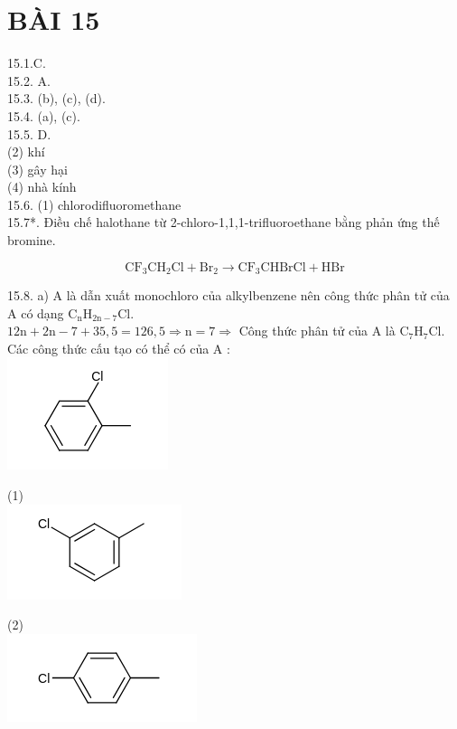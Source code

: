 \documentclass[10pt]{article}
\begin{document}
\section*{BÀI 15}
15.1.C.\\
15.2. A.\\
15.3. (b), (c), (d).\\
15.4. (a), (c).\\
15.5. D.\\
(2) khí\\
(3) gây hại\\
(4) nhà kính\\
15.6. (1) chlorodifluoromethane\\
15.7*. Điều chế halothane từ 2-chloro-1,1,1-trifluoroethane bằng phản ứng thế bromine.

$$
\mathrm{CF}_{3} \mathrm{CH}_{2} \mathrm{Cl}+\mathrm{Br}_{2} \rightarrow \mathrm{CF}_{3} \mathrm{CHBrCl}+\mathrm{HBr}
$$

15.8. a) A là dẫn xuất monochloro của alkylbenzene nên công thức phân tử của A có dạng $\mathrm{C}_{\mathrm{n}} \mathrm{H}_{2 \mathrm{n}-7} \mathrm{Cl}$.\\
$12 \mathrm{n}+2 \mathrm{n}-7+35,5=126,5 \Rightarrow \mathrm{n}=7 \Rightarrow$ Công thức phân tử của A là $\mathrm{C}_{7} \mathrm{H}_{7} \mathrm{Cl}$.\\
Các công thức cấu tạo có thể có của A :\\
\includegraphics{smile-2bdfa513112a1638a51d15af02274ada0909ff1f}

(1)\\
\includegraphics{smile-dc5b33cb5b38b9fea4399a474cbc52574ef5d0fd}

(2)\\
\includegraphics{smile-e51d8ce81a1b169367232dc94837c091823d4bb4}
\end{document}
